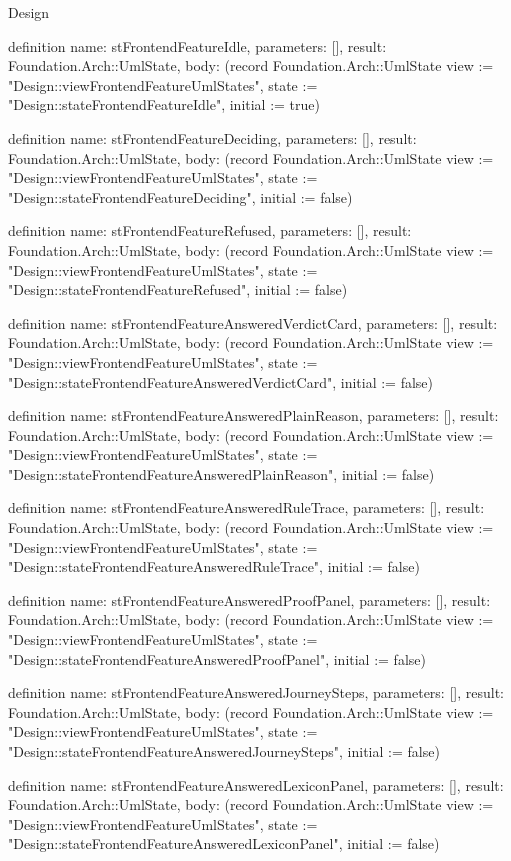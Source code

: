 \begin{lexlean}{Design}
\begin{semanticmodule}
definition{
  name: stFrontendFeatureIdle,
  parameters: [],
  result: Foundation.Arch::UmlState,
  body: (record Foundation.Arch::UmlState {view := "Design::viewFrontendFeatureUmlStates", state := "Design::stateFrontendFeatureIdle", initial := true})
}

definition{
  name: stFrontendFeatureDeciding,
  parameters: [],
  result: Foundation.Arch::UmlState,
  body: (record Foundation.Arch::UmlState {view := "Design::viewFrontendFeatureUmlStates", state := "Design::stateFrontendFeatureDeciding", initial := false})
}

definition{
  name: stFrontendFeatureRefused,
  parameters: [],
  result: Foundation.Arch::UmlState,
  body: (record Foundation.Arch::UmlState {view := "Design::viewFrontendFeatureUmlStates", state := "Design::stateFrontendFeatureRefused", initial := false})
}

definition{
  name: stFrontendFeatureAnsweredVerdictCard,
  parameters: [],
  result: Foundation.Arch::UmlState,
  body: (record Foundation.Arch::UmlState {view := "Design::viewFrontendFeatureUmlStates", state := "Design::stateFrontendFeatureAnsweredVerdictCard", initial := false})
}

definition{
  name: stFrontendFeatureAnsweredPlainReason,
  parameters: [],
  result: Foundation.Arch::UmlState,
  body: (record Foundation.Arch::UmlState {view := "Design::viewFrontendFeatureUmlStates", state := "Design::stateFrontendFeatureAnsweredPlainReason", initial := false})
}

definition{
  name: stFrontendFeatureAnsweredRuleTrace,
  parameters: [],
  result: Foundation.Arch::UmlState,
  body: (record Foundation.Arch::UmlState {view := "Design::viewFrontendFeatureUmlStates", state := "Design::stateFrontendFeatureAnsweredRuleTrace", initial := false})
}

definition{
  name: stFrontendFeatureAnsweredProofPanel,
  parameters: [],
  result: Foundation.Arch::UmlState,
  body: (record Foundation.Arch::UmlState {view := "Design::viewFrontendFeatureUmlStates", state := "Design::stateFrontendFeatureAnsweredProofPanel", initial := false})
}

definition{
  name: stFrontendFeatureAnsweredJourneySteps,
  parameters: [],
  result: Foundation.Arch::UmlState,
  body: (record Foundation.Arch::UmlState {view := "Design::viewFrontendFeatureUmlStates", state := "Design::stateFrontendFeatureAnsweredJourneySteps", initial := false})
}

definition{
  name: stFrontendFeatureAnsweredLexiconPanel,
  parameters: [],
  result: Foundation.Arch::UmlState,
  body: (record Foundation.Arch::UmlState {view := "Design::viewFrontendFeatureUmlStates", state := "Design::stateFrontendFeatureAnsweredLexiconPanel", initial := false})
}


\end{semanticmodule}
\end{lexlean}
